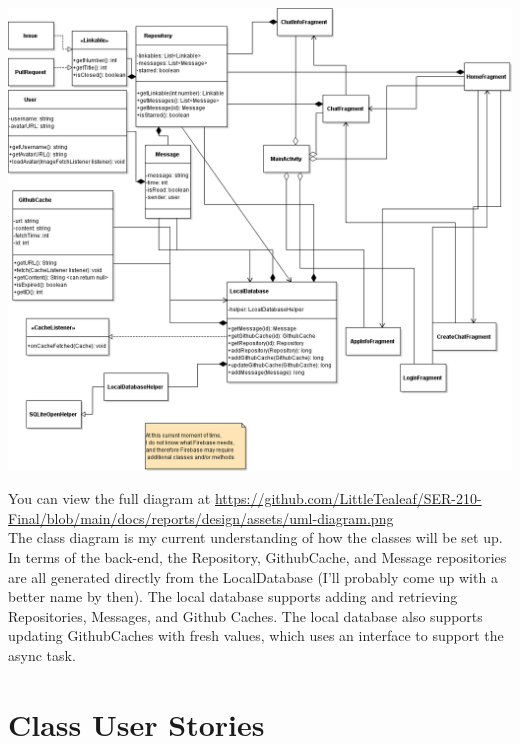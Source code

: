 \documentclass{report}
\begin{document}
\begin{center}
    \includegraphics[scale=0.4]{uml-diagram}
\end{center}
You can view the full diagram at \href{https://github.com/LittleTealeaf/SER-210-Final/blob/main/docs/reports/design/assets/uml-diagram.png}{https://github.com/LittleTealeaf/SER-210-Final/blob/main/docs/reports/design/assets/uml-diagram.png}\\

The class diagram is my current understanding of how the classes will be set up. In terms of the back-end, the Repository, GithubCache, and Message repositories are all generated directly from the LocalDatabase (I'll probably come up with a better name by then). The local database supports adding and retrieving Repositories, Messages, and Github Caches. The local database also supports updating GithubCaches with fresh values, which uses an interface to support the async task.

\section{Class User Stories}
\end{document}
